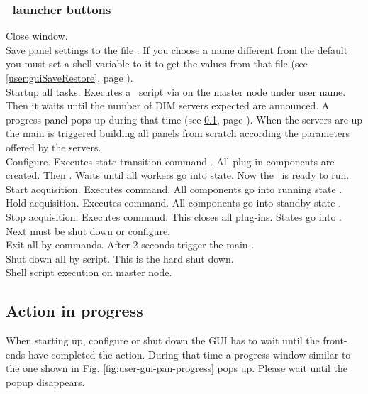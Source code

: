 {\subsubsection{\dabc\ launcher buttons}
 Close window.\\
 Save panel settings to the file .
If you choose a name different from the default you must
set a shell variable to it to get the values from that file
(see \ref{user:guiSaveRestore}, page \pageref{user:guiSaveRestore}).\\
 Startup all tasks. Executes a \dabc\ script via  
on the master node under user name. Then it waits until the number of DIM servers
expected are announced. A progress panel pops up during that time
(see \ref{user:guiProgress}, page \pageref{user:guiProgress}).
When the servers are up the main  is triggered building
all panels from scratch according the parameters offered by the servers.\\
 Configure. Executes state transition command .
All plug-in components are created. Then .
Waits until all workers go into  state. Now the \dabc\ is ready to run.\\
 Start acquisition. Executes  command.
All components go into running state .\\
 Hold acquisition. Executes  command.
All components go into standby state .\\
 Stop acquisition. Executes  command.
This closes all plug-ins. States go into . Next must be
shut down or configure.\\
 Exit all by  commands. After 2 seconds 
trigger the main .\\
 Shut down all by script. This is the hard shut down.\\
 Shell script execution on master node.\\
\subsection{Action in progress}
\label{user:guiProgress}
When starting up, configure or shut down the GUI has to wait
until the front-ends have completed the action.
During that time a progress window similar to the one shown
in Fig. \ref{fig:user-gui-pan-progress} pops up.
Please wait until the popup disappears.
}
